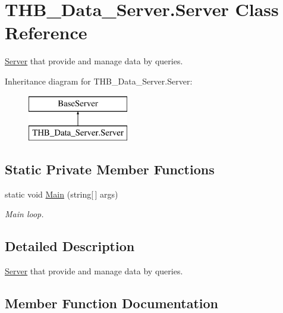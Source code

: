 \hypertarget{class_t_h_b___data___server_1_1_server}{}\section{T\+H\+B\+\_\+\+Data\+\_\+\+Server.\+Server Class Reference}
\label{class_t_h_b___data___server_1_1_server}


\mbox{\hyperlink{class_t_h_b___data___server_1_1_server}{Server}} that provide and manage data by queries.  


Inheritance diagram for T\+H\+B\+\_\+\+Data\+\_\+\+Server.\+Server\+:\begin{figure}[H]
\begin{center}
\leavevmode
\includegraphics[height=2.000000cm]{dc/d42/class_t_h_b___data___server_1_1_server}
\end{center}
\end{figure}
\subsection*{Static Private Member Functions}
\begin{DoxyCompactItemize}
\item 
static void \mbox{\hyperlink{class_t_h_b___data___server_1_1_server_a87515fb7b3422af002d33dd3fbe8f4e9}{Main}} (string\mbox{[}$\,$\mbox{]} args)
\begin{DoxyCompactList}\small\item\em Main loop. \end{DoxyCompactList}\end{DoxyCompactItemize}


\subsection{Detailed Description}
\mbox{\hyperlink{class_t_h_b___data___server_1_1_server}{Server}} that provide and manage data by queries. 



\subsection{Member Function Documentation}
\mbox{\label{class_t_h_b___data___server_1_1_server_a87515fb7b3422af002d33dd3fbe8f4e9}} 
